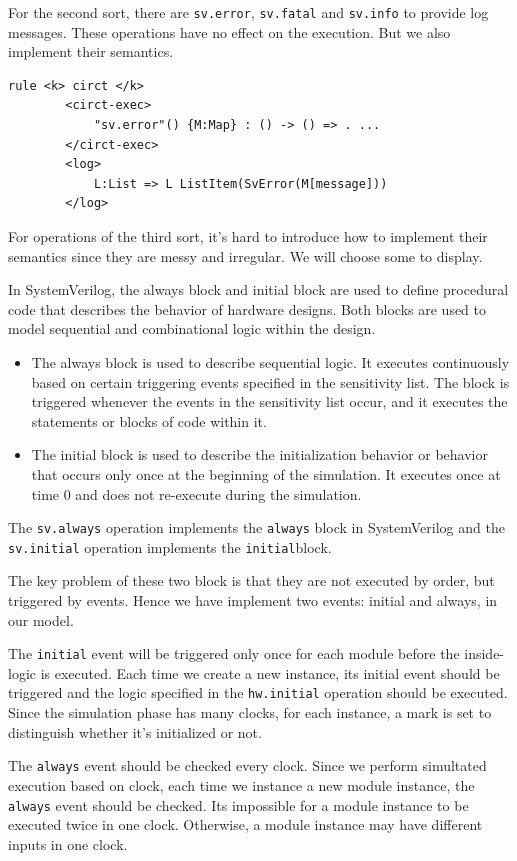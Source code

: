 For the second sort, there are \verb|sv.error|, \verb|sv.fatal| and \verb|sv.info| to provide log messages. These operations have no effect on the execution. But we also implement their semantics.

\begin{lstlisting}
rule <k> circt </k>
        <circt-exec> 
            "sv.error"() {M:Map} : () -> () => . ...
        </circt-exec>
        <log>
            L:List => L ListItem(SvError(M[message]))
        </log>
\end{lstlisting}

For operations of the third sort, it's hard to introduce how to implement their semantics since they are messy and irregular. We will choose some to display.


In SystemVerilog, the always block and initial block are used to define procedural code that describes the behavior of hardware designs. Both blocks are used to model sequential and combinational logic within the design.
\begin{itemize}
    \item The always block is used to describe sequential logic. It executes continuously based on certain triggering events specified in the sensitivity list. The block is triggered whenever the events in the sensitivity list occur, and it executes the statements or blocks of code within it.
    \item The initial block is used to describe the initialization behavior or behavior that occurs only once at the beginning of the simulation. It executes once at time 0 and does not re-execute during the simulation.
\end{itemize}

The \verb|sv.always| operation implements the \verb|always| block in SystemVerilog and the \verb|sv.initial| operation implements the \verb|initial|block.

The key problem of these two block is that they are not executed by order, but triggered by events. Hence we have implement two events: initial and always, in our model.

The \verb|initial| event will be triggered only once for each module before the inside-logic is executed. Each time we create a new instance, its initial event should be triggered and the logic specified in the \verb|hw.initial| operation should be executed. Since the simulation phase has many clocks, for each instance, a mark is set to distinguish whether it's initialized or not.

The \verb|always| event should be checked every clock. Since we perform simultated execution based on clock, each time we instance a new module instance, the \verb|always| event should be checked. Its impossible for a module instance to be executed twice in one clock. Otherwise, a module instance may have different inputs in one clock.


